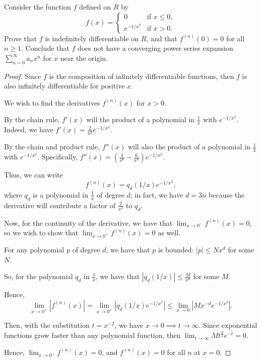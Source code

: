 \documentclass[../hw1]{subfiles}
\begin{document}
\begin{problem}
Consider the function $f$ defined on $R$ by \[
	f(x) = \begin{cases}
		0            & \text{if } x\le 0, \\
		e^{-1 / x^2} & \text{if } x > 0.
	\end{cases}
\]
Prove that $f$ is indefinitely differentiable on $R$, and that $f^{(n)}(0)=0$ for all $n\ge 1$.
Conclude that $f$ does not have a converging power series expansion $\sum_{n=0}^{\infty} a_n x^n$ for $x$ near the origin.
\end{problem}
\begin{proof}
	Since $f$ is the composition of infinitely differentiable functions, then  $f$ is also infinitely differentiable for  positive $x$.


	We wish to find the derivatives $f^{(n)}(x)$ for $x > 0$.

	By the chain rule, $f'(x)$ will the product of a polynomial in $\frac{1}{x}$ with $e^{-1 / x^2}$.
	Indeed, we have $f'(x)=\frac{2}{x^3}e^{-1 / x^2}$.


	By the chain and product rule, $f''(x)$ will also the product of a polynomial in $\frac{1}{x}$ with $e^{-1 / x^2}$.
	Specifically, $f''(x)=\left( \frac{4}{x^6}-\frac{6}{x^4} \right)e^{-1 / x^2}$.

	Thus, we can write \[
		f^{(n)}(x) = q_{d}(1 / x)e^{-1 / x^2}
		,\] where $q_d$ is a polynomial in $\frac{1}{x}$ of degree $d$;
	in fact, we have $d=3n$ because the derivative will contribute a factor of $\frac{2}{x^3}$ to $q_d$.

	Now, for the continuity of the derivative, we have that $\lim_{x \to 0^-} f^{(n)}(x)=0$, so we wish to show that $\lim_{x \to 0^+} f^{(n)}(x) =0$ as well.

	For any polynomial $p$ of degree $d$, we have that $p$ is bounded: $|p|\le Nx^d$ for some $N$.

	So, for the polynomial $q_d$ in $\frac{1}{x}$, we have that $|q_d(1 / x)|\le \frac{M}{x^d}$ for some $M$.

	Hence,  \[
		\lim_{x \to 0^+} |f^{(n)}(x)| =
		\lim_{x \to 0^+} |q_d(1 / x)e^{-1 / x^2}| \le
		\lim_{x \to 0}|Mx^{-d}e^{-1 / x^2}|
		.\]

	Then, with the substitution $t=x^{-2}$, we have $x\to 0 \implies t \to \infty$.
	Since exponential functions grow faster than any polynomial function, then $\lim_{t \to \infty} M t^{\frac{d}{2}}e^{-t}=0$.

	Hence, $\lim_{x \to 0^+} f^{(n)}(x) = 0$, and $f^{(n)}(x)=0$ for all $n$ at $x=0$.



\end{proof}
\end{document}
